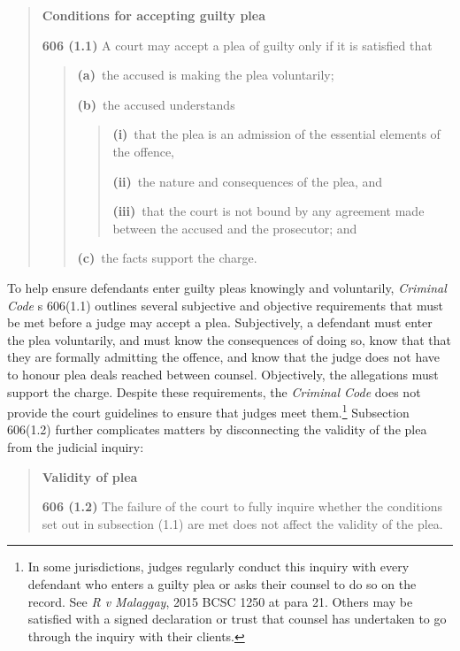 \break
\begin{quote}
    \singlespacing
    \textbf{Conditions for accepting guilty plea}
    
    \textbf{606 (1.1)} A court may accept a plea of guilty only if it is satisfied that

    \begin{quote}
        \textbf{(a)} the accused is making the plea voluntarily;
        
        \textbf{(b)} the accused understands
        \begin{quote}
            \textbf{(i)} that the plea is an admission of the essential elements of the offence,
            
            \textbf{(ii)} the nature and consequences of the plea, and
            
            \textbf{(iii)} that the court is not bound by any agreement made between the accused and the prosecutor; and   
        \end{quote}
        \textbf{(c)} the facts support the charge.
    \end{quote}

\end{quote}

To help ensure defendants enter guilty pleas knowingly and voluntarily, \textit{Criminal Code} s 606(1.1) outlines several subjective and objective requirements that must be met before a judge may accept a plea. Subjectively, a defendant must enter the plea voluntarily, and must know the consequences of doing so, know that that they are formally admitting the offence, and know that the judge does not have to honour plea deals reached between counsel. Objectively, the allegations must support the charge. Despite these requirements, the \textit{Criminal Code} does not provide the court guidelines to ensure that judges meet them.\footnote{In some jurisdictions, judges regularly conduct this inquiry with every defendant who enters a guilty plea or asks their counsel to do so on the record. See \textit{R v Malaggay}, 2015 BCSC 1250 at para 21. Others may be satisfied with a signed declaration or trust that counsel has undertaken to go through the inquiry with their clients.} Subsection 606(1.2) further complicates matters by disconnecting the validity of the plea from the judicial inquiry:

\begin{quote}
    \onehalfspacing
    \textbf{Validity of plea}
    
    \textbf{606 (1.2)} The failure of the court to fully inquire whether the conditions set out in subsection (1.1) are met does not affect the validity of the plea.
\end{quote}

